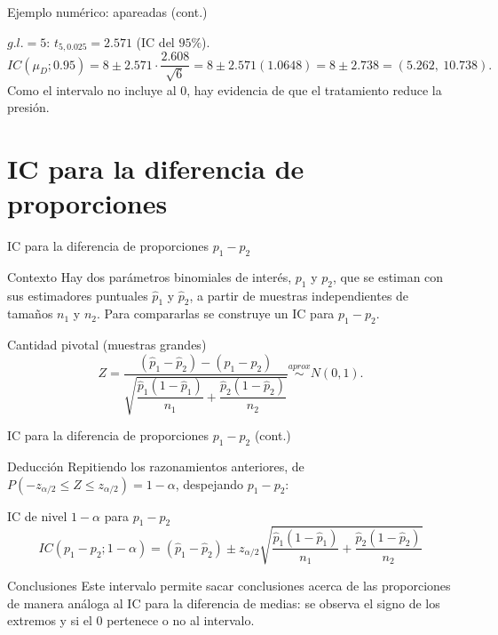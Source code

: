 \documentclass[aspectratio=169,11pt]{beamer}
\begin{document}
\begin{frame}{Ejemplo numérico: apareadas (cont.)}
\begin{example}
$g.l.=5$: $t_{5,0.025}=2.571$ (IC del $95\%$).
\[
IC(\mu_D;0.95) = 8 \pm 2.571\cdot\frac{2.608}{\sqrt 6} = 8\pm 2.571(1.0648) = 8\pm 2.738 = (5.262,\ 10.738).
\]
Como el intervalo no incluye al $0$, hay evidencia de que el tratamiento reduce la presión.
\end{example}
\end{frame}

\section{IC para la diferencia de proporciones}

\begin{frame}{IC para la diferencia de proporciones $p_1-p_2$}
\begin{block}{Contexto}
Hay dos parámetros binomiales de interés, $p_1$ y $p_2$, que se estiman con sus estimadores puntuales $\widehat p_1$ y $\widehat p_2$, a partir de muestras independientes de tamaños $n_1$ y $n_2$. Para compararlas se construye un IC para $p_1-p_2$.
\end{block}

\begin{block}{Cantidad pivotal (muestras grandes)}
\[
Z = \frac{(\widehat p_1-\widehat p_2)-(p_1-p_2)}{\sqrt{\dfrac{\widehat p_1(1-\widehat p_1)}{n_1}+\dfrac{\widehat p_2(1-\widehat p_2)}{n_2}}} \overset{aprox}{\sim} N(0,1).
\]
\end{block}
\end{frame}

\begin{frame}{IC para la diferencia de proporciones $p_1-p_2$ (cont.)}
\begin{block}{Deducción}
Repitiendo los razonamientos anteriores, de $P(-z_{\alpha/2}\le Z\le z_{\alpha/2}) = 1-\alpha$, despejando $p_1-p_2$:
\end{block}
\begin{alertblock}{IC de nivel $1-\alpha$ para $p_1-p_2$}
\[
IC(p_1-p_2;1-\alpha) = (\widehat p_1-\widehat p_2) \pm z_{\alpha/2}\sqrt{\frac{\widehat p_1(1-\widehat p_1)}{n_1}+\frac{\widehat p_2(1-\widehat p_2)}{n_2}}
\]
\end{alertblock}
\begin{block}{Conclusiones}
Este intervalo permite sacar conclusiones acerca de las proporciones de manera análoga al IC para la diferencia de medias: se observa el signo de los extremos y si el $0$ pertenece o no al intervalo.
\end{block}
\end{frame}
\end{document}
